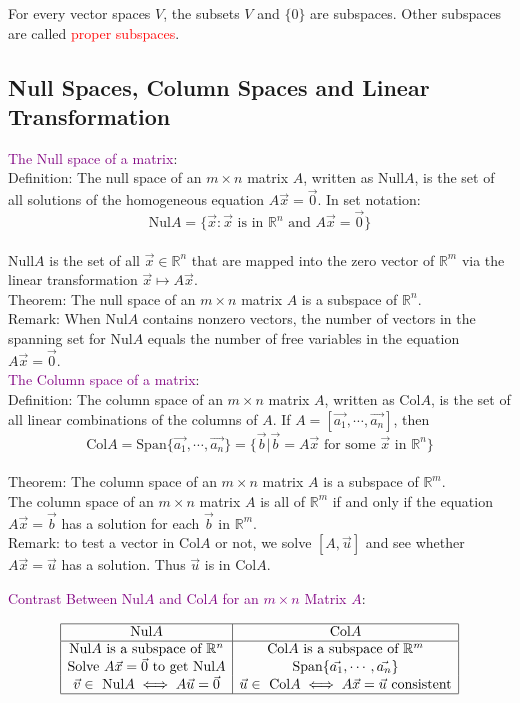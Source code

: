 \documentclass[12pt]{article}
\begin{document}
For every vector spaces $V$, the subsets $V$ and $\{0\}$ are subspaces. Other subspaces are called \textcolor{red}{proper subspaces}.

\subsection{Null Spaces, Column Spaces and Linear Transformation}
\textcolor{purple}{The Null space of a matrix}:
\\
Definition: The null space of an $m\times n$ matrix $A$, written as Null$A$, is the set of all solutions of the homogeneous equation $A\vec{x} = \vec{0}$. In set notation: $$\text{Nul}A = \{\vec{x} : \vec{x} \text{ is in }\mathbb{R}^n \text{ and } A\vec{x} = \vec{0}\}$$
\\
Null$A$ is the set of all $\vec{x} \in \mathbb{R}^n$ that are mapped into the zero vector of $\mathbb{R}^m$ via the linear transformation $\vec{x}  \longmapsto  A\vec{x}$.
\\
Theorem: The null space of an $m\times n$ matrix $A$ is a subspace of $\mathbb{R}^n$.
\\
Remark: When Nul$A$ contains nonzero vectors, the number of vectors in the spanning set for Nul$A$ equals the number of free variables in the equation $A\vec{x} = \vec{0}$.
\\
\textcolor{purple}{The Column space of a matrix}:
\\
Definition: The column space of an $m\times n$ matrix $A$, written as Col$A$, is the set of all linear combinations of the columns of $A$. If $A = [\vec{a_1}, \cdots, \vec{a_n}]$, then  $$\text{Col}A = \text{Span}\{\vec{a_1}, \cdots, \vec{a_n}\} = \{\vec{b}|\vec{b} = A\vec{x} \text{ for some }\vec{x}\text{ in }\mathbb{R}^n\}$$
\\
Theorem: The column space of an $m\times n$ matrix $A$ is a subspace of $\mathbb{R}^m$.
\\
The column space of an $m\times n$ matrix $A$ is all of $\mathbb{R}^m$ if and only if the equation $A\vec{x} = \vec{b}$ has a solution for each $\vec{b}$ in $\mathbb{R}^m$.
\\
Remark: to test a vector in Col$A$ or not, we solve $[A, \vec{u}]$ and see whether $A\vec{x} = \vec{u}$ has a solution. Thus $\vec{u}$ is in Col$A$.

\textcolor{purple}{Contrast Between Nul$A$ and Col$A$ for an $m\times n$ Matrix $A$}:

$$\begin{array}{|c|c|}
    \hline
    \text{Nul}A & \text{Col}A\\
    \hline
    \text{Nul}A\text{ is a subspace of }\mathbb{R}^n & \text{Col}A\text{ is a subspace of }\mathbb{R}^m\\
    \text{Solve }A\vec{x} = \vec{0} \text{ to get Nul}A & \text{Span}\{\vec{a_1}, \cdots, \vec{a_n}\}\\
    \vec{v}\in \text{ Nul}A \iff A\vec{u} = \vec{0} & \vec{u}\in\text{ Col}A \iff A\vec{x} = \vec{u} \text{ consistent}\\
    \hline
\end{array}$$
\end{document}
